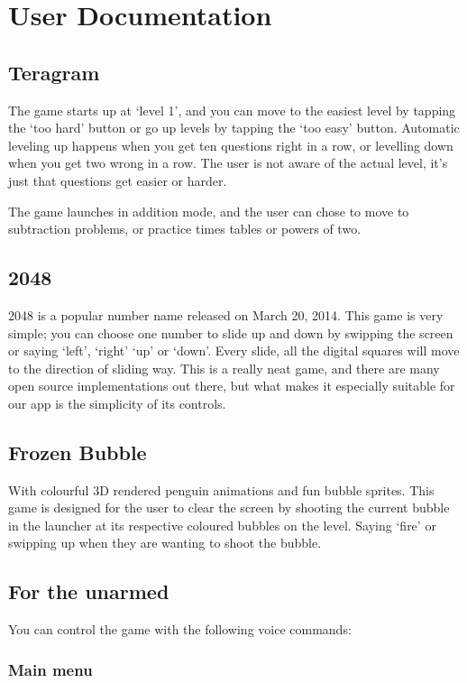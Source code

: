 \documentclass[11pt, oneside]{article}
\begin{document}
\pagebreak

\section*{User Documentation}

\subsection*{Teragram}
The game starts up at `level 1', and you can move to the easiest level
by tapping the `too hard' button or go up levels by tapping the `too
easy' button. Automatic leveling up happens when you get ten
questions right in a row, or levelling down when you get two wrong in
a row. The user is not aware of the actual level, it's just that
questions get easier or harder.

The game launches in addition mode, and the user can chose to move to
subtraction problems, or practice times tables or powers of two.

\subsection*{2048}
2048 is a popular number name released on March 20, 2014. This game is
very simple; you can choose one number to slide up and down by
swipping the screen or saying `left', `right' `up' or `down'. Every
slide, all the digital squares will move to the direction of sliding
way. This is a really neat game, and there are many open source
implementations out there, but what makes it especially suitable for
our app is the simplicity of its controls.

\subsection*{Frozen Bubble}
With colourful 3D rendered penguin animations and fun bubble sprites. 
This game is designed for the user to clear the screen by shooting the 
current bubble in the launcher at its respective coloured bubbles on 
the level. Saying `fire' or swipping up when they are wanting to shoot
the bubble.  

\subsection*{For the unarmed}

You can control the game with the following voice commands:

\subsubsection*{Main menu}
\end{document}
